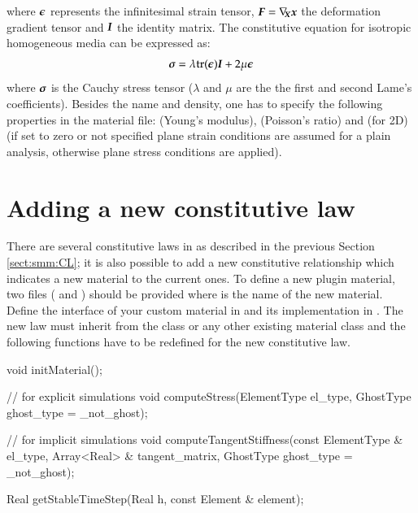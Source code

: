 where $\boldsymbol{\epsilon}$ represents the infinitesimal strain tensor, $\boldsymbol{F} =
\nabla_{\!\!\boldsymbol{X}}\boldsymbol{x}$ the deformation gradient tensor and $\boldsymbol{I}$ the
identity matrix. The constitutive equation for isotropic homogeneous media can
be expressed as:
\begin{equation}\label{eqn:smm:material:constitutive_elastic}
  \boldsymbol{\sigma } =\lambda\mathrm{tr}(\boldsymbol{\epsilon})\boldsymbol{I}+2 \mu \boldsymbol{\epsilon}
\end{equation}
where $\boldsymbol{\sigma}$ is the Cauchy stress tensor ($\lambda$ and $\mu$ are the
the first and second Lame's coefficients). Besides the name and density, one has
to specify the following properties in the material file:  (Young's
modulus),  (Poisson's ratio) and (for 2D)  (if set
to zero or not specified plane strain conditions are assumed for a plain
analysis, otherwise plane stress conditions are applied).




\section{Adding a new constitutive law}

There are several constitutive laws in \akantu as described in the
previous Section \ref{sect:smm:CL}; it is also possible to add a new
constitutive relationship which indicates a new material to the current ones. To
define a new plugin material, two files ( and
) should be provided where  is the name of the
new material. Define the interface of your custom material  in  and its implementation in .  The new law must inherit from the
 class or any other existing material class and the following
functions have to be redefined for the new constitutive law.

\begin{cpp}
  void initMaterial();

  // for explicit simulations
  void computeStress(ElementType el_type, GhostType ghost_type = _not_ghost);

  // for implicit simulations
  void computeTangentStiffness(const ElementType & el_type,
                               Array<Real> & tangent_matrix,
                               GhostType ghost_type = _not_ghost);

  Real getStableTimeStep(Real h, const Element & element);
\end{cpp}

